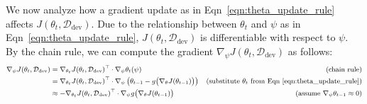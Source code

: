 We now analyze how a gradient update as in Eqn~\ref{eqn:theta_update_rule} affects $J(\theta_t, \mathcal{D}_{\text{dev}})$. 
Due to the relationship between $\theta_t$ and $\psi$ as in Eqn~\ref{eqn:theta_update_rule}, $J(\theta_t, \mathcal{D}_\text{dev})$ is differentiable with respect to $\psi$. 
By the chain rule, we can compute the gradient $\nabla_\psi J(\theta_t, \mathcal{D}_\text{dev})$ as follows:
\begin{equation}
  \label{eqn:two_step_update}
   \small
  \begin{aligned}
    \nabla_\psi J(\theta_t, \mathcal{D}_\text{dev})
      &= \nabla_{\theta_t} J(\theta_t, \mathcal{D}_\text{dev})^\top \cdot \nabla_\psi \theta_t(\psi) &\text{(chain rule)} \\
      &= \nabla_{\theta_t} J(\theta_t, \mathcal{D}_\text{dev})^\top \cdot \nabla_\psi \left( \theta_{t-1} - g\big( \nabla_\theta J(\theta_{t-1}) \big) \right) &\text{(substitute $\theta_t$ from Eqn~\ref{eqn:theta_update_rule})} \\
      &\approx -\nabla_{\theta_t} J(\theta_t, \mathcal{D}_\text{dev})^\top \cdot \nabla_\psi g\big( \nabla_\theta J(\theta_{t-1}) \big) &\text{(assume $\nabla_\psi \theta_{t-1} \approx 0$)} %
  \end{aligned}
\end{equation}
